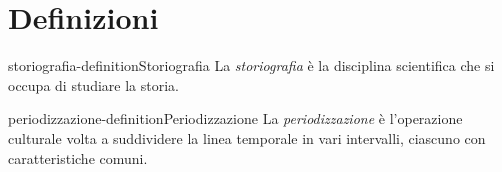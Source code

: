 \documentclass[preview]{standalone}
\begin{document}
\genpage

\section{Definizioni}

\begin{snippetdefinition}{storiografia-definition}{Storiografia}
    La \textit{storiografia} è la disciplina scientifica che si occupa di studiare la storia.
\end{snippetdefinition}

\begin{snippetdefinition}{periodizzazione-definition}{Periodizzazione}
    La \textit{periodizzazione} è l'operazione culturale volta a suddividere la linea temporale in vari intervalli,
    ciascuno con caratteristiche comuni.
\end{snippetdefinition}

\end{document}
